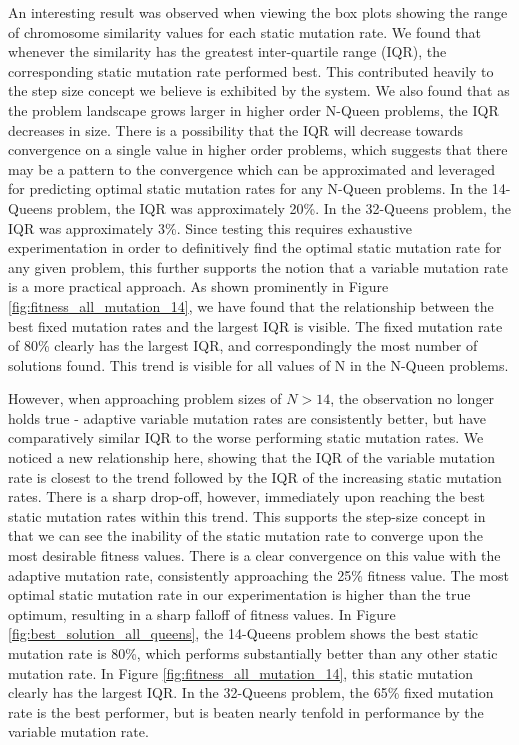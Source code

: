 \documentclass[conference]{IEEEtran}
\begin{document}
An interesting result was observed when viewing the box plots showing the range of chromosome similarity values for each static mutation rate. We found that whenever the similarity has the greatest inter-quartile range (IQR), the corresponding static mutation rate performed best. This contributed heavily to the step size concept we believe is exhibited by the system. We also found that as the problem landscape grows larger in higher order N-Queen problems, the IQR decreases in size. There is a possibility that the IQR will decrease towards convergence on a single value in higher order problems, which suggests that there may be a pattern to the convergence which can be approximated and leveraged for predicting optimal static mutation rates for any N-Queen problems. In the 14-Queens problem, the IQR was approximately 20\%. In the 32-Queens problem, the IQR was approximately 3\%. Since testing this requires exhaustive experimentation in order to definitively find the optimal static mutation rate for any given problem, this further supports the notion that a variable mutation rate is a more practical approach. As shown prominently in Figure \ref{fig:fitness_all_mutation_14}, we have found that the relationship between the best fixed mutation rates and the largest IQR is visible. The fixed mutation rate of 80\% clearly has the largest IQR, and correspondingly the most number of solutions found. This trend is visible for all values of N in the N-Queen problems. 

However, when approaching problem sizes of $N > 14$, the observation no longer holds true - adaptive variable mutation rates are consistently better, but have comparatively similar IQR to the worse performing static mutation rates. We noticed a new relationship here, showing that the IQR of the variable mutation rate is closest to the trend followed by the IQR of the increasing static mutation rates. There is a sharp drop-off, however, immediately upon reaching the best static mutation rates within this trend. This supports the step-size concept in that we can see the inability of the static mutation rate to converge upon the most desirable fitness values. There is a clear convergence on this value with the adaptive mutation rate, consistently approaching the 25\% fitness value. The most optimal static mutation rate in our experimentation is higher than the true optimum, resulting in a sharp falloff of fitness values. In Figure \ref{fig:best_solution_all_queens}, the 14-Queens problem shows the best static mutation rate is 80\%, which performs substantially better than any other static mutation rate. In Figure \ref{fig:fitness_all_mutation_14}, this static mutation clearly has the largest IQR. In the 32-Queens problem, the 65\% fixed mutation rate is the best performer, but is beaten nearly tenfold in performance by the variable mutation rate.
\end{document}
